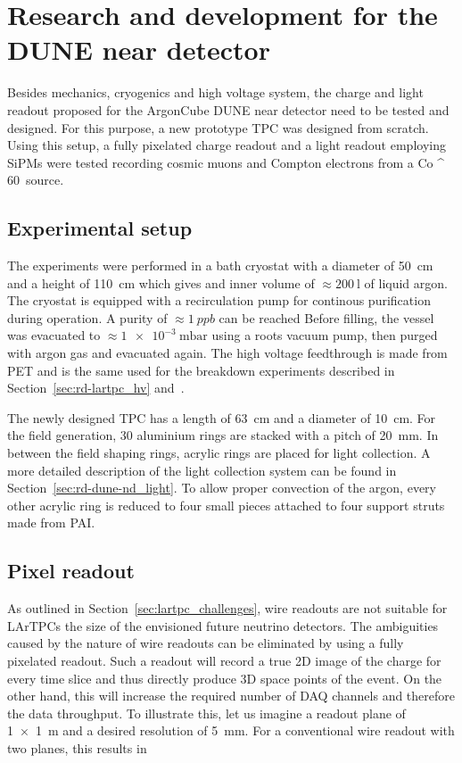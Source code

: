 \chapter{Research and development for the DUNE near detector\label{chap:rd-dune-nd}}
Besides mechanics, cryogenics and high voltage system, the charge and light readout proposed for the ArgonCube DUNE near detector need to be tested and designed.
For this purpose, a new prototype TPC was designed from scratch.
Using this setup, a fully pixelated charge readout and a light readout employing SiPMs were tested recording cosmic muons and Compton electrons from a \si{Co ^ {60}} source.


\section{Experimental setup\label{sec:rd-dune-nd_setup}}
The experiments were performed in a bath cryostat with a diameter of \SI{50}{\centi\metre} and a height of \SI{110}{\centi\metre} which gives and inner volume of $\approx \SI{200}{\litre}$ of liquid argon.
The cryostat is equipped with a recirculation pump for continous purification during operation.
A purity of $\approx \SI{1}{ppb}$ can be reached
Before filling, the vessel was evacuated to $\approx \SI{1e-3}{\milli\bar}$ using a roots vacuum pump, then purged with argon gas and evacuated again.
The high voltage feedthrough is made from PET and is the same used for the breakdown experiments described in Section~\ref{sec:rd-lartpc_hv} and~\cite{breakdown_14, breakdown_16}.

The newly designed TPC has a length of \SI{63}{\centi\metre} and a diameter of \SI{10}{\centi\metre}. %
For the field generation, \num{30} aluminium rings are stacked with a pitch of \SI{20}{\milli\metre}.
In between the field shaping rings, acrylic rings are placed for light collection.
A more detailed description of the light collection system can be found in Section~\ref{sec:rd-dune-nd_light}.
To allow proper convection of the argon, every other acrylic ring is reduced to four small pieces attached to four support struts made from PAI.


\section{Pixel readout\label{sec:rd-dune-nd_readout}}
As outlined in Section~\ref{sec:lartpc_challenges}, wire readouts are not suitable for LArTPCs the size of the envisioned future neutrino detectors.
The ambiguities caused by the nature of wire readouts can be eliminated by using a fully pixelated readout.
Such a readout will record a true 2D image of the charge for every time slice and thus directly produce 3D space points of the event.
On the other hand, this will increase the required number of DAQ channels and therefore the data throughput.
To illustrate this, let us imagine a readout plane of \SI{1 x 1}{\metre} and a desired resolution of \SI{5}{\milli\metre}.
For a conventional wire readout with two planes, this results in

